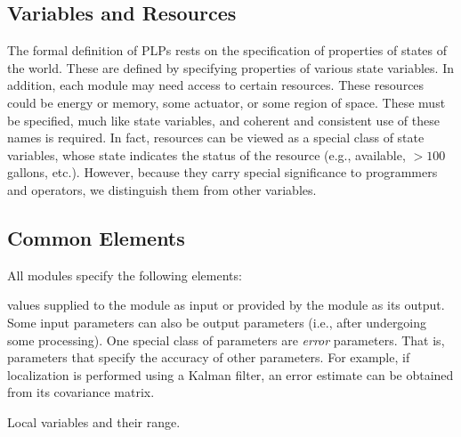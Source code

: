 \documentclass[ 5p, 12pt, times, twocolumn, sort&compress ]{elsarticle}
\begin{document}
\subsection{Variables and Resources}
The formal definition of PLPs rests on the specification of properties of states of the world. 
These are defined by specifying properties of various state variables.
%
In addition, each module may need access to certain resources. These resources could be energy or memory, some actuator, or some region of space. These must be specified, much like state variables, and coherent and consistent use of these names is required. In fact, resources can be viewed as a special class of state variables, whose state indicates the status of the resource (e.g., available, $> 100$ gallons, etc.). 
However, because they carry special significance to programmers and operators, we distinguish them from other variables. 


\subsection{Common Elements}
All modules specify the following elements:

 values supplied to the module as input or provided by the module as its output. Some input
parameters can also be output parameters (i.e., after undergoing some processing). One special class of parameters are {\em error\/} parameters. That is, parameters that specify the accuracy of other parameters. For example, if localization is performed using a Kalman filter, an error estimate can be obtained from its covariance matrix.

 Local variables and their range.
\end{document}
